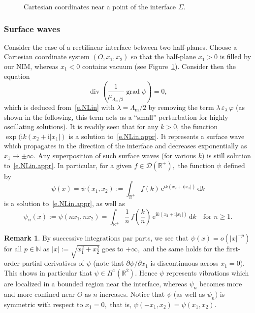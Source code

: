 \documentclass[11pt]{article}
\theoremstyle{definition}
\newtheorem{rema}[theo]{Remark}
\numberwithin{equation}{section}
\numberwithin{figure}{section}
\numberwithin{table}{section}
\DeclareMathOperator{\Div}{div}
\DeclareMathOperator{\grad}{grad}
\newcommand{\epsl}{\varepsilon}
\newcommand{\calD}{\mathcal{D}}
\newcommand{\bbN}{\mathbb{N}}
\newcommand{\bbR}{\mathbb{R}}
\newcommand{\rmd}{{\mathrm{d}}}
\newcommand{\rme}{{\mathrm{e}}}
\newcommand{\rmi}{{\mathrm{i}}}
\newcommand{\Lm}{{\Lambda_{\mathrm{m}}}}
\begin{document}
\begin{figure}[!t]
\begin{center}
\end{center}
\caption{Cartesian coordinates near a point of the interface $\Sigma.$}\label{f.surf-res}
\end{figure}

\subsubsection{Surface waves}
Consider the case of a rectilinear interface between two half-planes. Choose a Cartesian coordinate system $(O,x_1,x_2)$ so that the half-plane $x_1 > 0$ is filled by our NIM, whereas $x_1 < 0$ contains vacuum (see Figure~\ref{f.surf-res}). Consider then the equation
\begin{equation}\label{e.NLin.appr}
\Div \left(\frac{1}{\mu_{\Lm/2}} \grad \psi \right) = 0,
\end{equation}
which is deduced from~\eqref{e.NLin} with $\lambda = \Lm/2$ by removing the term $\lambda\,\epsl_\lambda\,\varphi$ (as shown in the following, this term acts as a ``small'' perturbation for highly oscillating solutions). It is readily seen that for any $k>0$, the function $\exp(\rmi k(x_2 + \rmi |x_1|)$ is a solution to~\eqref{e.NLin.appr}. It represents a surface wave which propagates in the direction of the interface and decreases exponentially as $x_1 \to \pm\infty.$ Any superposition of such surface waves (for various $k)$ is still solution to~\eqref{e.NLin.appr}. In particular, for a given $f \in \calD(\bbR^+),$ the function $\psi$ defined by
\[
\psi(x) = \psi(x_1,x_2) :=
\int_{\bbR^+} f(k)\,\rme^{\rmi k(x_2 + \rmi |x_1|)}\, \rmd k
\]
is a solution to~\eqref{e.NLin.appr}, as well as
\[
\psi_n(x) := \psi(nx_1,nx_2) =
\int_{\bbR^+} \frac{1}{n}\,f\left(\frac{k}{n}\right)\,\rme^{\rmi k(x_2 + \rmi |x_1|)}\, \rmd k
\quad\text{for }n \geq 1.
\]

\begin{rema}\label{r.surf-res}
By successive integrations par parts, we see that $\psi(x) = o(|x|^{-p})$ for all $p \in \bbN$ as $|x| := \sqrt{x_1^2 + x_2^2}$ goes to $+\infty,$ and the same holds for the first-order partial derivatives of $\psi$ (note that $\partial\psi/\partial x_1$ is discontinuous across $x_1=0).$ This shows in particular that $\psi \in H^1(\bbR^2).$ Hence $\psi$ represents vibrations which are localized in a bounded region near the interface, whereas $\psi_n$ becomes more and more confined near $O$ as $n$ increases. Notice that $\psi$ (as well as $\psi_n)$ is symmetric with respect to $x_1=0,$ that is, $\psi(-x_1,x_2) = \psi(x_1,x_2).$
\end{rema}
\end{document}
